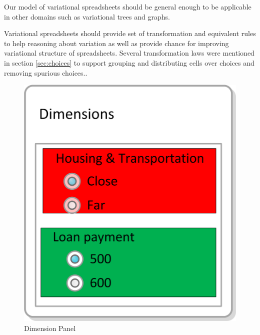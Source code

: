 \documentclass[conference]{IEEEtran}
\newcommand{\figscale}{0.6}
\begin{document}
\begin{inparaenum}[(1)]
\item Our model of variational spreadsheets should be general enough to be applicable in other domains
such as variational trees and graphs.

\item Variational spreadsheets should provide set of transformation and equivalent rules to help
reasoning about variation as well as provide chance for improving variational structure of spreadsheets.
Several transformation laws were mentioned in section \ref{sec:choices} to support grouping and 
distributing cells over choices and removing spurious choices..


\end{inparaenum}


\begin{figure}
\centering
\includegraphics[scale=\figscale]{img/dimension_panel}
\caption{Dimension Panel}
\label{fig:dimpan}
\end{figure}
\end{document}
